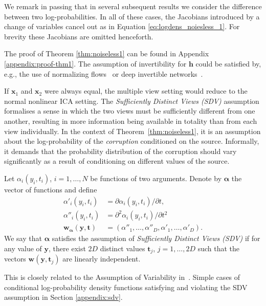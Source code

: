 We remark in passing that in several subsequent results we consider the difference between two log-probabilities.
In all of these cases, the Jacobians introduced by a change of variables cancel out as in Equation \ref{eq:logdens_noiesless_1}.
For brevity these Jacobians are omitted henceforth.

The proof of Theorem \ref{thm:noiseless1} can be found in Appendix \ref{appendix:proof-thm1}.
The assumption of invertibility for $\bm{h}$ could be satisfied by, e.g., the use of normalizing flows~\citep{rezende2015variational, chen2018neural} or deep invertible networks~\citep{jacobsen_hal-01712808}.


If $\bm{x}_1$ and $\bm{x}_2$ were always equal, the multiple view setting would reduce to the normal nonlinear ICA setting.
The \emph{Sufficiently Distinct Views (SDV)} assumption formalises a sense in which the two views must be sufficiently different from one another,
resulting in more information being available in totality than from each view individually.
In the context of Theorem~\ref{thm:noiseless1}, it is an assumption about the log-probability of the \emph{corruption} conditioned on the source.
Informally, it demands that the probability distribution of the corruption should vary significantly as a result of conditioning on different values of the source.

\medskip

\begin{definition}\label{suff_dist_assumption}
	Let $\alpha_i(y_i, t_i)$, $i=1,\ldots, N$ be functions of two arguments.
	Denote by $\bm\alpha$ the vector of functions and define
	\begin{align}
	\alpha'_{i}(y_i, t_i)&= \partial \alpha_{i}(y_i, t_i)/\partial t, \label{eq:convention1}\\
	\alpha''_{i}(y_i, t_i)&=\partial^2 \alpha_{i}(y_i, t_i)/\partial t^2\, \label{eq:convention2}\\
	\bm{w}_{\bm\alpha}(\bm{y}, \bm{t}) &= (\alpha''_{1}, \ldots, \alpha''_{D}, \alpha'_{1}, \ldots,\alpha'_{D}).
	\end{align}
	We say that $\bm{\alpha}$ satisfies the assumption of \emph{Sufficiently Distinct Views (SDV)} if for any value of $\bm{y}$, there exist $2D$ distinct values $\bm{t}_j$, $j=1, \ldots, 2D$ such that the vectors $\bm{w}(\bm{y},\bm{t}_j)$ are linearly independent.
	\\    \end{definition}
This is closely related to the Assumption of Variability in~\cite{hyvarinen19a}.
Simple cases of conditional log-probability density functions satisfying and violating the SDV assumption in Section \ref{appendix:sdv}.

